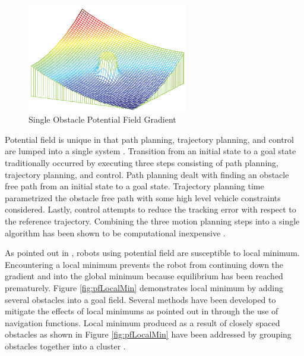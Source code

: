 \documentclass[numbered,pdftex]{ohio-etd}
\begin{document}
\begin{figure}[h!]
	\centering
	\includegraphics[width=7cm]{PaperFigures/pfObstacle}
	\caption{Single Obstacle Potential Field Gradient \cite{liu_virtual-waypoint_2016}}
	\label{fig:pfobstacle}
\end{figure}

Potential field is unique in that path planning, trajectory planning, and control are lumped into a single system \cite{rimon_exact_1992}. Transition from an initial state to a goal state traditionally occurred by executing three steps consisting of path planning, trajectory planning, and control. Path planning dealt with finding an obstacle free path from an initial state to a goal state. Trajectory planning time parametrized the obstacle free path with some high level vehicle constraints considered. Lastly, control attempts to reduce the tracking error with respect to the reference trajectory. Combining the three motion planning steps into a single algorithm has been shown to be computational inexpensive \cite{goerzen_survey_2010}. 

As pointed out in \cite{borenstein_real-time_1990}, robots using potential field are susceptible to local minimum. Encountering a local minimum prevents the robot from continuing down the gradient and into the global minimum because equilibrium has been reached prematurely. Figure \ref{fig:pfLocalMin} demonstrates local minimum by adding several obstacles into a goal field. Several methods have been developed to mitigate the effects of local minimums as pointed out in \cite{goerzen_survey_2010} through the use of navigation functions. Local minimum produced as a result of closely spaced obstacles as shown in Figure \ref{fig:pfLocalMin} have been addressed by grouping obstacles together into a cluster \cite{liu_virtual-waypoint_2016}.
\end{document}
